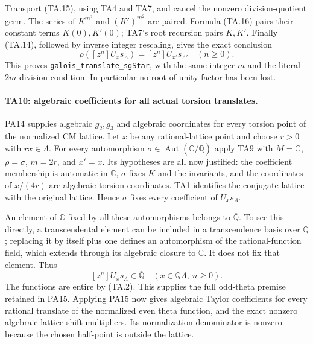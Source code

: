 Transport (TA.15), using TA4 and TA7, and cancel the nonzero
division-quotient germ. The series of $K^{m^2}$ and
$(K')^{m^2}$ are paired. Formula (TA.16) pairs their constant
terms $K(0),K'(0)$; TA7's root recursion pairs $K,K'$.
Finally (TA.14), followed by inverse integer rescaling,
gives the exact conclusion
\[
 \rho([z^n]U_xs_\Lambda)=[z^n]U_{x'}s_{\Lambda'}\quad(n\ge0).
                                                                  \tag{TA.18}
\]
This proves \texttt{galois\_translate\_sgStar}, with the same
integer $m$ and the literal $2m$-division condition. In
particular no root-of-unity factor has been lost.

\paragraph{TA10: algebraic coefficients for all actual torsion translates.}
PA14 supplies algebraic $g_2,g_3$ and algebraic coordinates
for every torsion point of the normalized CM lattice. Let
$x$ be any rational-lattice point and choose $r>0$ with
$rx\in\Lambda$. For every automorphism
$\sigma\in\operatorname{Aut}(\mathbb C/\overline{\mathbb Q})$
apply TA9 with $M=\mathbb C$, $\rho=\sigma$, $m=2r$, and
$x'=x$. Its hypotheses are all now justified: the coefficient
membership is automatic in $\mathbb C$, $\sigma$ fixes $K$
and the invariants, and the coordinates of $x/(4r)$ are
algebraic torsion coordinates. TA1 identifies the conjugate
lattice with the original lattice. Hence $\sigma$ fixes
every coefficient of $U_xs_\Lambda$.

An element of $\mathbb C$ fixed by all these automorphisms
belongs to $\overline{\mathbb Q}$. To see this directly, a
transcendental element can be included in a transcendence
basis over $\overline{\mathbb Q}$; replacing it by itself
plus one defines an automorphism of the rational-function
field, which extends through its algebraic closure to
$\mathbb C$. It does not fix that element. Thus
\[
 [z^n]U_xs_\Lambda\in\overline{\mathbb Q}
       \quad(x\in\mathbb Q\Lambda,\ n\ge0).                 \tag{TA.19}
\]
The functions are entire by (TA.2). This supplies the full
odd-theta premise retained in PA15. Applying PA15 now gives
algebraic Taylor coefficients for every rational translate
of the normalized even theta function, and the exact
nonzero algebraic lattice-shift multipliers. Its normalization
denominator is nonzero because the chosen half-point is
outside the lattice.

